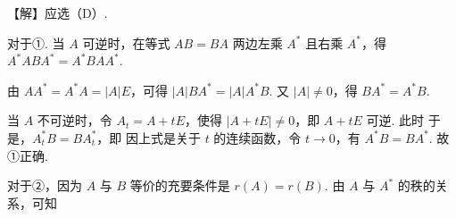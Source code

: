 【解】应选（D）.

对于①. 当 $A$ 可逆时，在等式 $AB=BA$ 两边左乘 $A^*$ 且右乘 $A^*$，得 $A^*ABA^*=A^*BAA^*$.

由 $AA^*=A^*A=|A|E$，可得 $|A|BA^*=|A|A^*B$. 又 $|A|\ne0$，得 $BA^*=A^*B$.

当 $A$ 不可逆时，令 $A_t=A+tE$，使得 $|A+tE|\ne0$，即 $A+tE$ 可逆. 此时
于是，$A_t^*B=BA_t^*$，即
因上式是关于 $t$ 的连续函数，令 $t\to0$，有 $A^*B=BA^*$. 故①正确.

对于②，因为 $A$ 与 $B$ 等价的充要条件是 $r(A)=r(B)$. 由 $A$ 与 $A^*$ 的秩的关系，可知

